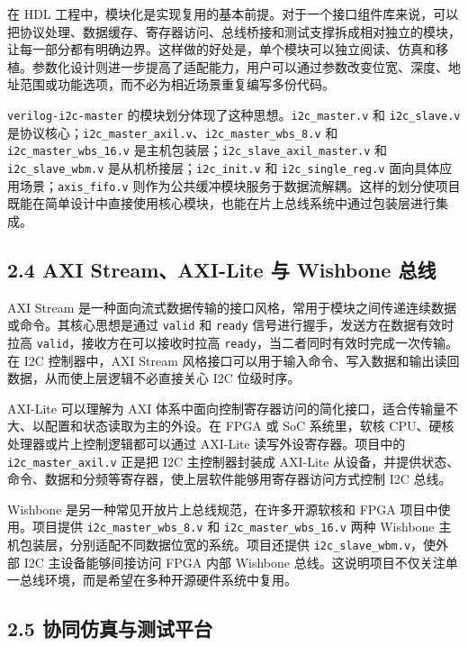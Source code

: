 在 HDL 工程中，模块化是实现复用的基本前提。对于一个接口组件库来说，可以把协议处理、数据缓存、寄存器访问、总线桥接和测试支撑拆成相对独立的模块，让每一部分都有明确边界。这样做的好处是，单个模块可以独立阅读、仿真和移植。参数化设计则进一步提高了适配能力，用户可以通过参数改变位宽、深度、地址范围或功能选项，而不必为相近场景重复编写多份代码。

\texttt{verilog-i2c-master} 的模块划分体现了这种思想。\texttt{i2c\_master.v} 和 \texttt{i2c\_slave.v} 是协议核心；\texttt{i2c\_master\_axil.v}、\texttt{i2c\_master\_wbs\_8.v} 和 \texttt{i2c\_master\_wbs\_16.v} 是主机包装层；\texttt{i2c\_slave\_axil\_master.v} 和 \texttt{i2c\_slave\_wbm.v} 是从机桥接层；\texttt{i2c\_init.v} 和 \texttt{i2c\_single\_reg.v} 面向具体应用场景；\texttt{axis\_fifo.v} 则作为公共缓冲模块服务于数据流解耦。这样的划分使项目既能在简单设计中直接使用核心模块，也能在片上总线系统中通过包装层进行集成。

\subsection{2.4 AXI Stream、AXI-Lite 与 Wishbone 总线}\label{axi-streamaxi-lite-ux4e0e-wishbone-ux603bux7ebf}

AXI Stream 是一种面向流式数据传输的接口风格，常用于模块之间传递连续数据或命令。其核心思想是通过 \texttt{valid} 和 \texttt{ready} 信号进行握手，发送方在数据有效时拉高 \texttt{valid}，接收方在可以接收时拉高 \texttt{ready}，当二者同时有效时完成一次传输。在 I2C 控制器中，AXI Stream 风格接口可以用于输入命令、写入数据和输出读回数据，从而使上层逻辑不必直接关心 I2C 位级时序。

AXI-Lite 可以理解为 AXI 体系中面向控制寄存器访问的简化接口，适合传输量不大、以配置和状态读取为主的外设。在 FPGA 或 SoC 系统里，软核 CPU、硬核处理器或片上控制逻辑都可以通过 AXI-Lite 读写外设寄存器。项目中的 \texttt{i2c\_master\_axil.v} 正是把 I2C 主控制器封装成 AXI-Lite 从设备，并提供状态、命令、数据和分频等寄存器，使上层软件能够用寄存器访问方式控制 I2C 总线。

Wishbone 是另一种常见开放片上总线规范，在许多开源软核和 FPGA 项目中使用。项目提供 \texttt{i2c\_master\_wbs\_8.v} 和 \texttt{i2c\_master\_wbs\_16.v} 两种 Wishbone 主机包装层，分别适配不同数据位宽的系统。项目还提供 \texttt{i2c\_slave\_wbm.v}，使外部 I2C 主设备能够间接访问 FPGA 内部 Wishbone 总线。这说明项目不仅关注单一总线环境，而是希望在多种开源硬件系统中复用。

\subsection{2.5 协同仿真与测试平台}\label{ux534fux540cux4effux771fux4e0eux6d4bux8bd5ux5e73ux53f0}

